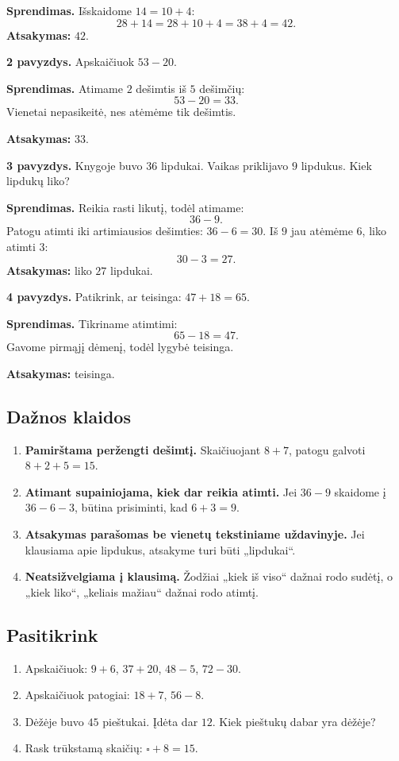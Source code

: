 \textbf{Sprendimas.} Išskaidome \(14=10+4\):
\[
28+14=28+10+4=38+4=42.
\]
\textbf{Atsakymas:} \(42\).

\textbf{2 pavyzdys.} Apskaičiuok \(53-20\).

\textbf{Sprendimas.} Atimame \(2\) dešimtis iš \(5\) dešimčių:
\[
53-20=33.
\]
Vienetai nepasikeitė, nes atėmėme tik dešimtis.

\textbf{Atsakymas:} \(33\).

\textbf{3 pavyzdys.} Knygoje buvo \(36\) lipdukai. Vaikas priklijavo \(9\) lipdukus. Kiek lipdukų liko?

\textbf{Sprendimas.} Reikia rasti likutį, todėl atimame:
\[
36-9.
\]
Patogu atimti iki artimiausios dešimties: \(36-6=30\). Iš \(9\) jau atėmėme \(6\), liko atimti \(3\):
\[
30-3=27.
\]
\textbf{Atsakymas:} liko \(27\) lipdukai.

\textbf{4 pavyzdys.} Patikrink, ar teisinga: \(47+18=65\).

\textbf{Sprendimas.} Tikriname atimtimi:
\[
65-18=47.
\]
Gavome pirmąjį dėmenį, todėl lygybė teisinga.

\textbf{Atsakymas:} teisinga.

\subsection{Dažnos klaidos}

\begin{enumerate}
\item \textbf{Pamirštama peržengti dešimtį.} Skaičiuojant \(8+7\), patogu galvoti \(8+2+5=15\).
\item \textbf{Atimant supainiojama, kiek dar reikia atimti.} Jei \(36-9\) skaidome į \(36-6-3\), būtina prisiminti, kad \(6+3=9\).
\item \textbf{Atsakymas parašomas be vienetų tekstiniame uždavinyje.} Jei klausiama apie lipdukus, atsakyme turi būti „lipdukai“.
\item \textbf{Neatsižvelgiama į klausimą.} Žodžiai „kiek iš viso“ dažnai rodo sudėtį, o „kiek liko“, „keliais mažiau“ dažnai rodo atimtį.
\end{enumerate}

\subsection{Pasitikrink}

\begin{enumerate}
\item Apskaičiuok: \(9+6\), \(37+20\), \(48-5\), \(72-30\).
\item Apskaičiuok patogiai: \(18+7\), \(56-8\).
\item Dėžėje buvo \(45\) pieštukai. Įdėta dar \(12\). Kiek pieštukų dabar yra dėžėje?
\item Rask trūkstamą skaičių: \(\square+8=15\).
\end{enumerate}

